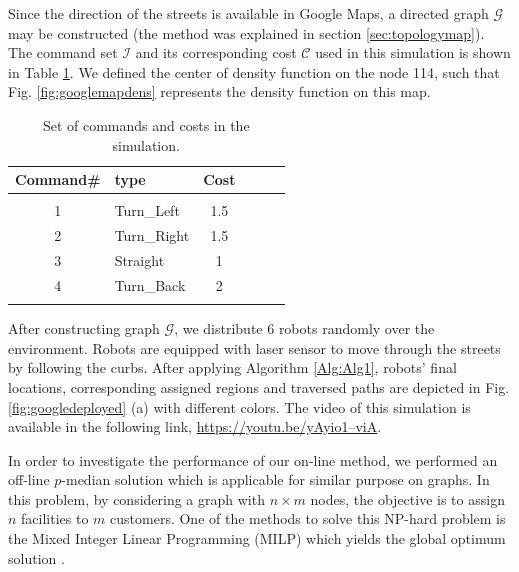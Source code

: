 \documentclass[smallcondensed]{svjour3}
\begin{document}
%
Since the direction of the streets is available in Google Maps, a directed graph $\mathcal G$ may be constructed (the method was explained in section \ref{sec:topologymap}). The command set $\mathcal{I}$ and its corresponding cost $\mathcal{C}$ used in this simulation is shown in Table \ref{tbl:commandsets}. We defined the center of density function on the node 114, such that Fig.
\ref{fig:googlemapdens} represents the density function on this map.

\begin{table}[t]
\centering
\caption{Set of commands and costs in the simulation.}
\label{tbl:commandsets}
\begin{tabular}{cm{1.5cm}cm{1.9cm}cm{1.8cm}}
Command\#  & type  & Cost    \\
\hline\\
1 & Turn\_Left &  1.5 \\
2 & Turn\_Right& 1.5\\
3 & Straight &  1\\
4 & Turn\_Back & 2\\
\hline\\
\end{tabular}
\end{table}

After constructing graph $\mathcal G$, we distribute 6 robots randomly over the environment. Robots are equipped with laser sensor to move through the streets by following the curbs. 
%
After applying Algorithm \ref{Alg:Alg1}, robots' final locations, corresponding assigned regions and traversed paths are depicted in Fig. \ref{fig:googledeployed} (a) with different colors. The video of this simulation is available in the following link, \href{https://youtu.be/yAyio1--viA}{https://youtu.be/yAyio1--viA}.

In order to investigate the performance of our on-line method, we performed an off-line $p$-median solution \cite{Daskin2015} which is applicable for similar purpose on graphs. In this problem, by considering a graph with $n \times m$ nodes, the objective is to assign $n$ facilities to $m$ customers. One of the methods to solve this NP-hard problem is the Mixed Integer Linear Programming (MILP) which yields the global optimum solution \cite{Edson2005}.
\end{document}
